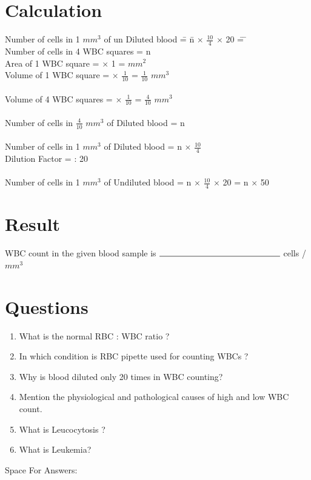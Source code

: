 \documentclass[a4paper,12pt,openany,twoside]{book}
\newcommand{\blankpageForAnswers}{
	\newpage
	\thispagestyle{plain}
	\begin{center}
		\Large Space For Answers: 
	\end{center}
	}
\begin{document}
					\section*{Calculation}
					\begin{tabbing}
Number of cells in 1 $mm^3$ of un Diluted blood \= = \= n $\times$ $\frac{10}{4}$ $\times$ 20 \= = \= \kill\\
					

					Number of cells in 4 WBC squares \> = \> n \\
					Area of 1 WBC square \> = \>	1$\times$ 1 \>	=  $mm^2$\\
					Volume of 1 WBC square\>	= $\times$ $\frac{1}{10}$ \> = \> $\frac{1}{10}$ $mm^3$\\
					\>\\
					Volume of 4 WBC squares \> = $\times$ $\frac{1}{10}$ \> = \> $\frac{4}{10}$ $mm^3$\\
					\> \\
					Number of cells in $\frac{4}{10}$ $mm^3$ of Diluted blood 	\> = \> n \\
					\> \\
					Number of cells in 1 $mm^3$ of Diluted blood \> = \>  	n $\times$ $\frac{10}{4}$\\
					Dilution Factor \> = \> 1 : 20\\
					\> \\
					Number of cells in 1 $mm^3$ of Undiluted blood \>	= \> n $\times$ $\frac{10}{4}$ $\times$ 20\>  =	\> n $\times$ 50\\
					\end{tabbing}

					\section *{Result}

					WBC count in the given  blood sample is $\rule{5cm}{0.5pt}$ cells / $mm^3$

					\section*{Questions}


					\begin{enumerate}

						\item{What is the normal RBC : WBC ratio ?}
						\item{ In which condition is RBC pipette used for counting WBCs ?}
						\item{ Why is blood diluted only 20 times in WBC counting?}
						\item{ Mention the physiological and pathological causes of high and low WBC count.}
						\item{ What is Leucocytosis ?}
						\item{ What is Leukemia?}
					\end{enumerate}
					\blankpageForAnswers
\end{document}
